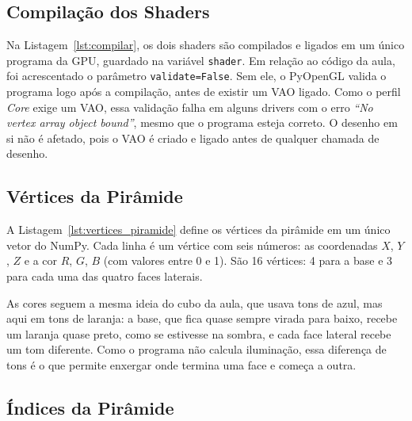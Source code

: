 \documentclass{article}
\begin{document}


\subsection{Compilação dos Shaders}

Na Listagem~\ref{lst:compilar}, os dois shaders são compilados e ligados em um único programa da GPU, guardado na variável \texttt{shader}. Em relação ao código da aula, foi acrescentado o parâmetro \texttt{validate=False}. Sem ele, o PyOpenGL valida o programa logo após a compilação, antes de existir um VAO ligado. Como o perfil \textit{Core} exige um VAO, essa validação falha em alguns drivers com o erro \textit{``No vertex array object bound''}, mesmo que o programa esteja correto. O desenho em si não é afetado, pois o VAO é criado e ligado antes de qualquer chamada de desenho.



\subsection{Vértices da Pirâmide}

A Listagem~\ref{lst:vertices_piramide} define os vértices da pirâmide em um único vetor do NumPy. Cada linha é um vértice com seis números: as coordenadas $X$, $Y$, $Z$ e a cor $R$, $G$, $B$ (com valores entre 0 e 1). São 16 vértices: 4 para a base e 3 para cada uma das quatro faces laterais.

As cores seguem a mesma ideia do cubo da aula, que usava tons de azul, mas aqui em tons de laranja: a base, que fica quase sempre virada para baixo, recebe um laranja quase preto, como se estivesse na sombra, e cada face lateral recebe um tom diferente. Como o programa não calcula iluminação, essa diferença de tons é o que permite enxergar onde termina uma face e começa a outra.



\subsection{Índices da Pirâmide}
\end{document}
